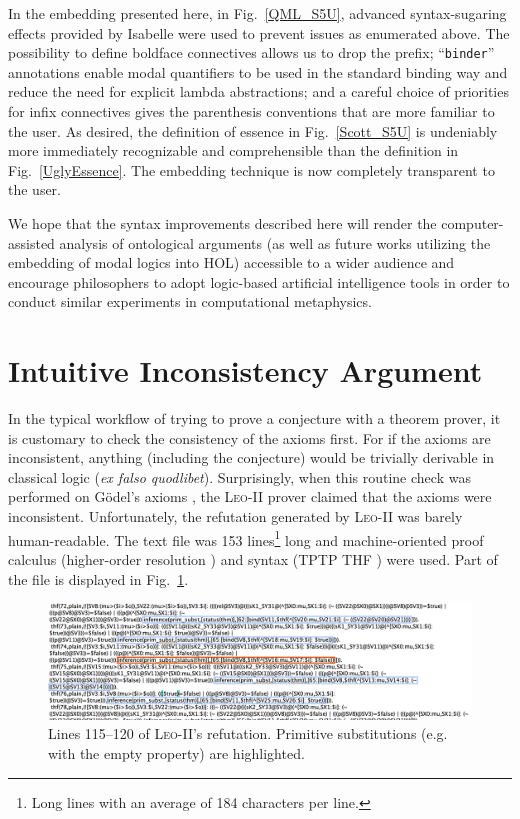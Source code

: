 \documentclass{article}
\begin{document}
In the embedding presented here, in Fig.~\ref{QML_S5U}, advanced
syntax-sugaring effects provided by Isabelle were used to prevent
issues as enumerated above. The possibility to define boldface connectives allows us to drop the prefix; ``\texttt{binder}'' annotations enable modal quantifiers to be used in the standard binding way and reduce the need for explicit lambda abstractions; and a careful choice of priorities for infix connectives gives the parenthesis conventions that are more familiar to the user. As desired, the definition of essence in Fig.~\ref{Scott_S5U} is undeniably more immediately recognizable and comprehensible than the definition in Fig.~\ref{UglyEssence}. The embedding technique is now completely transparent to the user.

We hope that the syntax improvements described here will render the computer-assisted analysis of ontological arguments (as well as future works utilizing the embedding of modal logics into HOL) accessible to a wider audience and encourage philosophers to adopt logic-based artificial intelligence tools in order to conduct similar experiments in computational metaphysics.


\section{Intuitive Inconsistency Argument} \label{sec:inconsistency}

In the typical workflow of trying to prove a conjecture with a theorem prover, it is customary to check the consistency of the axioms first. For if the axioms are inconsistent, anything (including the conjecture) would be trivially derivable in classical logic (\emph{ex falso quodlibet}). Surprisingly, when this routine check was performed on G\"odel's axioms \cite{C40}, the \textsc{Leo-II} prover claimed that the axioms were inconsistent. Unfortunately, the refutation generated by \textsc{Leo-II} was barely human-readable. The text file was 153 lines\footnote{Long lines with an average of 184 characters per line.} long and machine-oriented proof calculus (higher-order resolution \cite{W47}) and syntax (TPTP THF \cite{J22}) were used. Part of the file is displayed in Fig.~\ref{LEO-Proof}.

\begin{figure}
\centerline{\includegraphics[width=\textwidth]{./Images/LEO-Proof.png}}
\caption{Lines 115--120 of \textsc{Leo-II}'s refutation. Primitive
  substitutions (e.g. with the empty property) are highlighted.} \label{LEO-Proof}
\end{figure}
\end{document}
